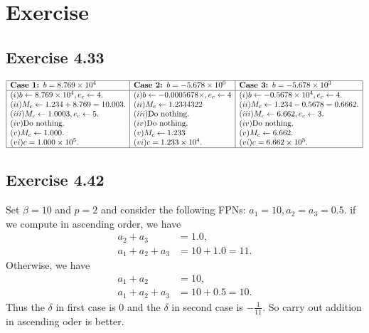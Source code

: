 \documentclass[a4paper]{article}
\begin{document}
\section{Exercise}
\subsection*{Exercise 4.33}

\[
\begin{array}{|l|l|l|}
\hline
\textbf{Case 1: $b = 8.769 \times 10^4$} & \textbf{Case 2: $b = -5.678 \times 10^0$} & \textbf{Case 3: $b = -5.678 \times 10^3$} \\ \hline

(i)b \leftarrow 8.769 \times 10^4, e_c \leftarrow 4. &
(i)b \leftarrow -0.0005678 \times, e_c \leftarrow 4  &
(i)b \leftarrow -0.5678 \times 10^4, e_c \leftarrow 4. \\

(ii) 
M_c \leftarrow 1.234 + 8.769 = 10.003. &
(ii) M_c\leftarrow 1.2334322 &
(ii) M_c \leftarrow 1.234 - 0.5678 = 0.6662. \\

(iii) 
M_c \leftarrow 1.0003, e_c \leftarrow 5. & 
(iii)\text{Do nothing.}&
(iii) M_c \leftarrow 6.662, e_c \leftarrow 3. \\

(iv)
\text{Do nothing.} &
(iv)\text{Do nothing.} &
(iv)\text{Do nothing.} \\

(v) 
M_c \leftarrow 1.000. & 
(v) M_c \leftarrow 1.233&
(v) M_c \leftarrow 6.662. \\

(vi) 
c = 1.000 \times 10^5. & 
(vi)c = 1.233 \times 10^4. &
(vi)c = 6.662 \times 10^3. \\ \hline
\end{array}
\]

\subsection*{Exercise 4.42}
Set $\beta = 10$ and $p = 2$ and consider the following FPNs: $a_1 = 10, a_2 = a_3 =0.5$.
if we compute in ascending order, we have 
\begin{align*}
  a_2 + a_3 &= 1.0,\\
  a_1 + a_2 + a_3 &= 10 + 1.0 = 11.
\end{align*}
Otherwise, we have
\begin{align*}
  a_1 + a_2 &= 10,\\
  a_1 + a_2 + a_3 &= 10 +0.5 = 10.
\end{align*}
Thus the $\delta$ in first case is 0 and the $\delta$ in second case is \(-\frac{1}{11}\). So carry out addition in ascending oder is better.
\end{document}
